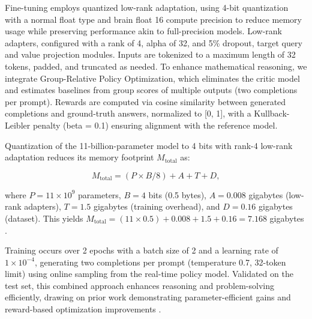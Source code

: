 \documentclass{svproc}
\begin{document}
Fine-tuning employs quantized low-rank adaptation, using 4-bit quantization with a normal float type and brain float 16 compute precision to reduce memory usage while preserving performance akin to full-precision models. Low-rank adapters, configured with a rank of 4, alpha of 32, and 5\% dropout, target query and value projection modules. Inputs are tokenized to a maximum length of 32 tokens, padded, and truncated as needed. To enhance mathematical reasoning, we integrate Group-Relative Policy Optimization, which eliminates the critic model and estimates baselines from group scores of multiple outputs (two completions per prompt). Rewards are computed via cosine similarity between generated completions and ground-truth answers, normalized to [0, 1], with a Kullback-Leibler penalty (beta = 0.1) ensuring alignment with the reference model.

Quantization of the 11-billion-parameter model to 4 bits with rank-4 low-rank adaptation reduces its memory footprint \( M_{\text{total}} \) as:

\begin{equation}
  M_{\text{total}} = (P \times B / 8) + A + T + D,
\end{equation}

\noindent
where \( P = 11 \times 10^9 \) parameters, \( B = 4 \) bits (0.5 bytes), \( A = 0.008 \) gigabytes (low-rank adapters), \( T = 1.5 \) gigabytes (training overhead), and \( D = 0.16 \) gigabytes (dataset). This yields \( M_{\text{total}} = (11 \times 0.5) + 0.008 + 1.5 + 0.16 = 7.168 \) gigabytes \cite{dettmers2023qloraefficientfinetuningquantized}.

Training occurs over 2 epochs with a batch size of 2 and a learning rate of \(1 \times 10^{-4}\), generating two completions per prompt (temperature 0.7, 32-token limit) using online sampling from the real-time policy model. Validated on the test set, this combined approach enhances reasoning and problem-solving efficiently, drawing on prior work demonstrating parameter-efficient gains and reward-based optimization improvements \cite{shao2024deepseekmathpushinglimitsmathematical}.

\end{document}
